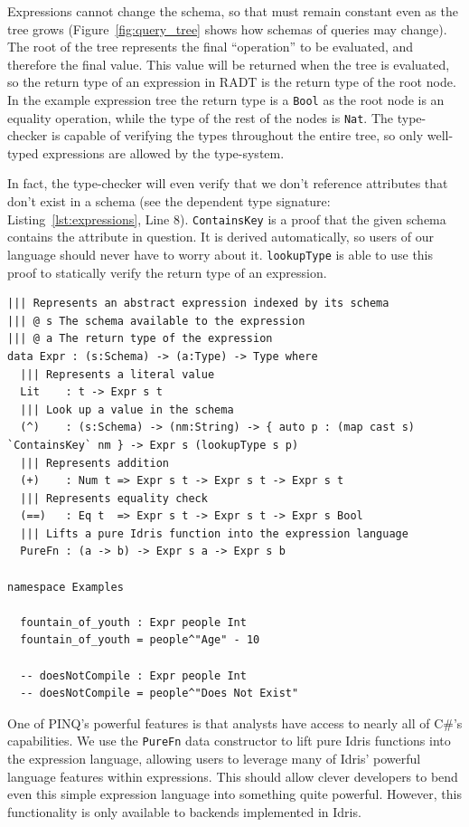 \documentclass[12pt]{report}
\begin{document}
Expressions cannot change the schema, so that must remain constant even as the tree grows (Figure~\ref{fig:query_tree} shows how schemas of queries may change).
The root of the tree represents the final ``operation'' to be evaluated, and therefore the final value.
This value will be returned when the tree is evaluated, so the return type of an expression in RADT is the return type of the root node.
In the example  expression tree the return type is a \texttt{Bool} as the root node is an equality operation, while the type of the rest of the nodes is \texttt{Nat}.
The type-checker is capable of verifying the types throughout the entire tree, so only well-typed expressions are allowed by the type-system.

In fact, the type-checker will even verify that we don't reference attributes that don't exist in a schema (see the dependent type signature: Listing~\ref{lst:expressions}, Line 8).
\texttt{ContainsKey} is a proof that the given schema contains the attribute in question.
It is derived automatically, so users of our language should never have to worry about it.
\texttt{lookupType} is able to use this proof to statically verify the return type of an expression.

\begin{lstlisting}[float,caption={Abstract representation of toy expression language},label={lst:expressions}]
||| Represents an abstract expression indexed by its schema
||| @ s The schema available to the expression
||| @ a The return type of the expression
data Expr : (s:Schema) -> (a:Type) -> Type where
  ||| Represents a literal value
  Lit    : t -> Expr s t
  ||| Look up a value in the schema
  (^)    : (s:Schema) -> (nm:String) -> { auto p : (map cast s) `ContainsKey` nm } -> Expr s (lookupType s p)
  ||| Represents addition
  (+)    : Num t => Expr s t -> Expr s t -> Expr s t
  ||| Represents equality check
  (==)   : Eq t  => Expr s t -> Expr s t -> Expr s Bool
  ||| Lifts a pure Idris function into the expression language
  PureFn : (a -> b) -> Expr s a -> Expr s b

namespace Examples

  fountain_of_youth : Expr people Int
  fountain_of_youth = people^"Age" - 10

  -- doesNotCompile : Expr people Int
  -- doesNotCompile = people^"Does Not Exist"
\end{lstlisting}

One of PINQ's powerful features is that analysts have access to nearly all of C\#'s capabilities.
We use the \texttt{PureFn} data constructor to lift pure Idris functions into the expression language, allowing users to leverage many of Idris' powerful language features within expressions.
This should allow clever developers to bend even this simple expression language into something quite powerful.
However, this functionality is only available to backends implemented in Idris.
\end{document}

